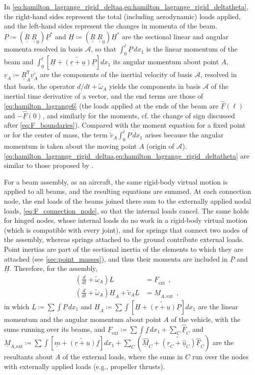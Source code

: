 \documentclass[12pt,a4paper,oneside,english]{abntex2} %
\newcommand{\fix}[1]{{\color{red}#1}}
\newcommand{\vect}[1]{\underline{#1}}
\def\tens#1{\underline{\underline{#1}}}
\def\til#1{\widetilde{#1}}
\def\lb{\left[}
\def\rb{\right]}
\def\lp{\left(}
\def\rp{\right)}
\def\T{\mathsf{T}}
\def\A{\mathcal{A}}
\def\xo{x_1}
\def\R{\tens{R}}
\def\Rz{\R_0}
\def\RAT{\R^\T_A}
\def\r{\vect{r}}
\def\u{\vect{u}}
\def\uhat{\widehat{\u}}
\def\vA{\vect{v}_A}
\def\vAo{\vA^{\circ}}
\def\omAtil{\til{\omega}_A}
\def\P{\vect{P}}
\def\Ps{\P^*}
\def\Hv{\vect{H}}
\def\Hvs{\Hv^*}
\def\F{\vect{F}}
\def\Fhat{\widehat{\F}}
\def\M{\vect{M}}
\def\Mhat{\widehat{\M}}
\def\f{\vect{f}}
\def\m{\vect{m}}
\def\RRz{\lp\R\;\Rz\rp}
\begin{document}
\fix{
In \cref{eq:hamilton_lagrange_rigid_deltaa,eq:hamilton_lagrange_rigid_deltatheta}, the right-hand sides represent the total (including aerodynamic) loads applied, and the left-hand sides represent the changes in momenta of the beam. $\P\coloneqq\RRz\Ps$ and $\Hv\coloneqq\RRz\Hvs$ are the sectional linear and angular momenta resolved in basis $\A$, so that $\int_0^\ell\P\,d\xo$ is the linear momentum of the beam and $\int_0^\ell\lb\Hv+\til{\lp\r+\u\rp}\P\rb d\xo$ its angular momentum about point $A$, $\vA\coloneqq\RAT\vAo$ are the components of the inertial velocity of basis $\A$, resolved in that basis, the operator $d/dt+\omAtil$ yields the components in basis $\A$ of the inertial time derivative of a vector, and the end terms are those of \cref{eq:hamilton_lagrange6} (the loads applied at the ends of the beam are $\Fhat(\ell)$ and $-\Fhat(0)$, and similarly for the moments, cf. the change of sign discussed after \cref{eq:F_boundaries}). Compared with the moment equation for a fixed point or for the center of mass, the term $\til{v}_A\int_0^\ell\P\,d\xo$ arises because the angular momentum is taken about the moving point $A$ (origin of $\A$). \cref{eq:hamilton_lagrange_rigid_deltaa,eq:hamilton_lagrange_rigid_deltatheta} are similar to those proposed by \citeonline{palacios2010structural}.
}

\fix{
For a beam assembly, as an aircraft, the same rigid-body virtual motion is applied to all beams, and the resulting equations are summed. At each connection node, the end loads of the beams joined there sum to the externally applied nodal loads, \cref{eq:F_connection_node}, so that the internal loads cancel. The same holds for hinged nodes, whose internal loads do no work in a rigid-body virtual motion (which is compatible with every joint), and for springs that connect two nodes of the assembly, whereas springs attached to the ground contribute external loads. Point inertias are part of the sectional inertia of the elements to which they are attached (see \cref{sec:point_masses}), and thus their momenta are included in $\P$ and $\Hv$. Therefore, for the assembly,
\begin{equation}
    \begin{aligned}
        \lp \frac{d}{dt} + \omAtil \rp \vect{L} &= \F_{\text{ext}} \ \ ,
        \\
        \lp \frac{d}{dt} + \omAtil \rp \Hv_A + \til{v}_A\vect{L} &= \M_{A,\text{ext}} \ \ ,
        \label{eq:rigid_body_motion_assembly}
    \end{aligned}
\end{equation}
in which $\vect{L}\coloneqq\sum\int\P\,d\xo$ and $\Hv_A\coloneqq\sum\int\lb\Hv+\til{\lp\r+\u\rp}\P\rb d\xo$ are the linear momentum and the angular momentum about point $A$ of the vehicle, with the sums running over its beams, and $\F_{\text{ext}}\coloneqq\sum\int\f\,d\xo+\sum_C\Fhat_C$ and $\M_{A,\text{ext}}\coloneqq\sum\int\lb\m+\til{\lp\r+\u\rp}\f\rb d\xo+\sum_C\lp\Mhat_C+\til{\lp\r_C+\uhat_C\rp}\Fhat_C\rp$ are the resultants about $A$ of the external loads, where the sums in $C$ run over the nodes with externally applied loads (e.g., propeller thrusts).
}
\end{document}

